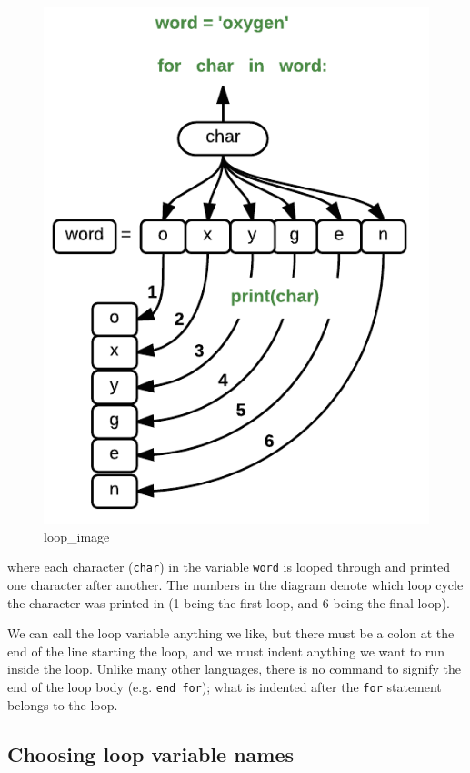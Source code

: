 \documentclass[]{book}
\theoremstyle{definition}
\theoremstyle{definition}
\theoremstyle{definition}
\theoremstyle{remark}
\begin{document}
\begin{figure}
\centering
\includegraphics{assets/loops_image.png}
\caption{loop\_image}
\end{figure}

where each character (\texttt{char}) in the variable \texttt{word} is
looped through and printed one character after another. The numbers in
the diagram denote which loop cycle the character was printed in (1
being the first loop, and 6 being the final loop).

We can call the loop variable anything we like, but there must be a
colon at the end of the line starting the loop, and we must indent
anything we want to run inside the loop. Unlike many other languages,
there is no command to signify the end of the loop body (e.g.
\texttt{end\ for}); what is indented after the \texttt{for} statement
belongs to the loop.

\hypertarget{choosing-loop-variable-names}{%
\subsection{Choosing loop variable
names}\label{choosing-loop-variable-names}}
\end{document}
